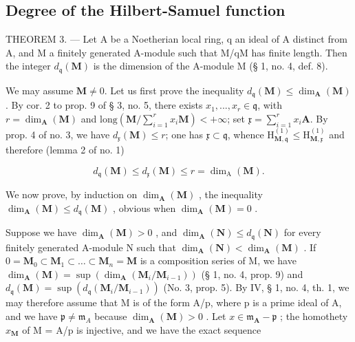 \subsection{Degree of the Hilbert-Samuel function}

THEOREM 3. --- Let A be a Noetherian local ring, q an ideal of A distinct from A, and M a finitely generated A-module such that M/qM has finite length. Then the integer \(d_{\mathfrak{q}}(\mathbf{M})\) is the dimension of the A-module M (§ 1, no. 4, def. 8).

We may assume \(\mathbf{M} \neq 0\). Let us first prove the inequality \(d_{\mathfrak{q}}(\mathbf{M}) \leqslant \dim_{\mathbf{A}}(\mathbf{M})\). By cor. 2 to prop. 9 of § 3, no. 5, there exists \(x_1, ..., x_r \in \mathfrak{q}\), with \(r = \dim_{\mathbf{A}}(\mathbf{M})\) and \(\text{long}(\mathbf{M}/\sum_{i=1}^{r} x_i \mathbf{M}) < +\infty\); set \(\mathfrak{x} = \sum_{i=1}^{r} x_i \mathbf{A}\). By prop. 4 of no. 3, we have \(d_{\mathfrak{x}}(\mathbf{M}) \leqslant r\); one has \(\mathfrak{x} \subset \mathfrak{q}\), whence \(\mathrm{H}_{\mathbf{M},\mathfrak{q}}^{(1)} \leqslant \mathrm{H}_{\mathbf{M},\mathfrak{x}}^{(1)}\) and therefore (lemma 2 of no. 1)

\[
d _ {\mathfrak{q}} (\mathbf {M}) \leqslant d _ {\mathfrak{x}} (\mathbf {M}) \leqslant r = \dim_ {\mathrm{A}} (\mathbf {M}).
\]

We now prove, by induction on \(\dim_{\mathbf{A}}(\mathbf{M})\) , the inequality \(\dim_{\mathbf{A}}(\mathbf{M}) \leqslant d_{\mathfrak{q}}(\mathbf{M})\) , obvious when \(\dim_{\mathbf{A}}(\mathbf{M}) = 0\) .

Suppose we have \(\dim_{\mathbf{A}}(\mathbf{M}) > 0\) , and \(\dim_{\mathbf{A}}(\mathbf{N}) \leqslant d_{\mathfrak{q}}(\mathbf{N})\) for every finitely generated A-module N such that \(\dim_{\mathbf{A}}(\mathbf{N}) < \dim_{\mathbf{A}}(\mathbf{M})\) . If \(0 = \mathbf{M}_0 \subset \mathbf{M}_1 \subset \ldots \subset \mathbf{M}_n = \mathbf{M}\) is a composition series of M, we have \(\dim_{\mathbf{A}}(\mathbf{M}) = \sup(\dim_{\mathbf{A}}(\mathbf{M}_i / \mathbf{M}_{i-1}))\) (§ 1, no. 4, prop. 9) and \(d_{\mathfrak{q}}(\mathbf{M}) = \sup(d_{\mathfrak{q}}(\mathbf{M}_i / \mathbf{M}_{i-1}))\) (No. 3, prop. 5). By IV, § 1, no. 4, th. 1, we may therefore assume that M is of the form A/p, where p is a prime ideal of A, and we have \(\mathfrak{p} \ne \mathfrak{m}_{A}\) because \(\dim_{\mathbf{A}}(\mathbf{M}) > 0\) . Let \(x \in \mathfrak{m}_{\mathbf{A}} - \mathfrak{p}\) ; the homothety \(x_{\mathbf{M}}\) of M = A/p is injective, and we have the exact sequence

